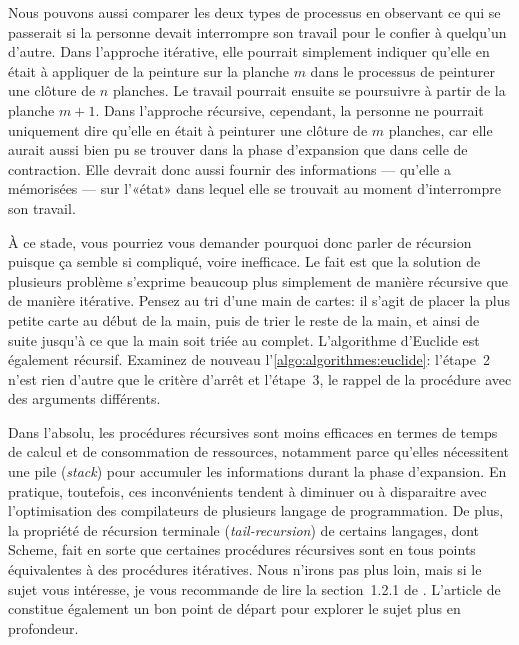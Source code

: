 Nous pouvons aussi comparer les deux types de processus en observant
ce qui se passerait si la personne devait interrompre son travail pour
le confier à quelqu'un d'autre. Dans l'approche itérative, elle
pourrait simplement indiquer qu'elle en était à appliquer de la
peinture sur la planche $m$ dans le processus de peinturer une clôture
de $n$ planches. Le travail pourrait ensuite se poursuivre à partir de
la planche $m + 1$. Dans l'approche récursive, cependant, la personne
ne pourrait uniquement dire qu'elle en était à peinturer une clôture
de $m$ planches, car elle aurait aussi bien pu se trouver dans la
phase d'expansion que dans celle de contraction. Elle devrait donc
aussi fournir des informations --- qu'elle a mémorisées --- sur
l'«état» dans lequel elle se trouvait au moment d'interrompre son
travail.

À ce stade, vous pourriez vous demander pourquoi donc parler de
récursion puisque ça semble si compliqué,
voire inefficace. Le fait est que la solution de plusieurs problème
s'exprime beaucoup plus simplement de manière récursive que de manière
itérative. Pensez au tri d'une main de cartes: il s'agit de placer la
plus petite carte au début de la main, puis de trier le reste de la
main, et ainsi de suite jusqu'à ce que la main soit triée au complet.
L'algorithme d'Euclide est
également récursif. Examinez de nouveau
l'\autoref{algo:algorithmes:euclide}: l'étape~2 n'est rien d'autre que
le critère d'arrêt et l'étape~3, le rappel de la procédure avec des
arguments différents.

Dans l'absolu, les procédures récursives sont moins efficaces en
termes de temps de calcul et de consommation de ressources, notamment
parce qu'elles nécessitent une pile (\emph{stack}) pour
accumuler les informations durant la phase d'expansion. En pratique,
toutefois, ces inconvénients tendent à diminuer ou à disparaitre avec
l'optimisation des compilateurs de plusieurs langage de programmation.
De plus, la propriété de
récursion terminale
(\emph{tail-recursion}) de certains langages, dont
Scheme, fait en sorte que certaines procédures
récursives sont en tous points équivalentes à des procédures
itératives. Nous n'irons pas plus loin, mais si le sujet vous
intéresse, je vous recommande de lire la section~1.2.1 de
\citet{Sussman:scheme:1996}. L'article de
\citet{Wikipedia:Recursion_terminale} constitue également un bon point
de départ pour explorer le sujet plus en profondeur.

